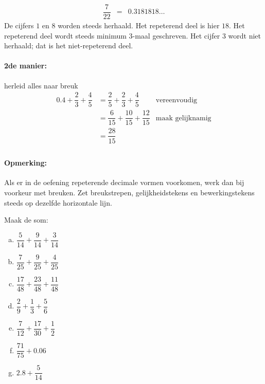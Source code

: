 \documentclass[12pt]{article}
\begin{document}
\begin{voorbeeld}
\begin{eqnarray*}
  \dfrac{7}{22} &=& 0.3181818\ldots
\end{eqnarray*}
De cijfers $1$ en $8$ worden steeds herhaald. Het repeterend deel is hier $18$.
Het repeterend deel wordt steeds minimum 3-maal geschreven.
Het cijfer $3$ wordt niet herhaald; dat is het niet-repeterend deel.
\end{voorbeeld}

\paragraph*{2de manier:} herleid alles naar breuk
\begin{align*}
  0.4 + \dfrac{2}{3} + \dfrac{4}{5} &= \dfrac{2}{5} + \dfrac{2}{3} + \dfrac{4}{5} & \text{vereenvoudig}\\
                                    &= \dfrac{6}{15} + \dfrac{10}{15} + \dfrac{12}{15} & \text{maak gelijknamig}\\
                                    &= \dfrac{28}{15}\\
\end{align*}

\paragraph*{Opmerking:} Als er in de oefening repeterende decimale vormen voorkomen, werk dan bij voorkeur met breuken.
Zet breukstrepen, gelijkheidstekens en bewerkingstekens steeds op dezelfde horizontale lijn.

\begin{exercise}
Maak de som:
\begin{multicols}{2}
  \begin{enumerate}[(a)]
    \item $\dfrac{5}{14}+\dfrac{9}{14}+\dfrac{3}{14}$
    \item $\dfrac{7}{25}+\dfrac{9}{25}+\dfrac{4}{25}$
    \item $\dfrac{17}{48}+\dfrac{23}{48}+\dfrac{11}{48}$
    \item $\dfrac{2}{9}+\dfrac{1}{3}+\dfrac{5}{6}$
    \item $\dfrac{7}{12}+\dfrac{17}{30}+\dfrac{1}{2}$
    \item $\dfrac{71}{75}+0.06$
    \item $2.8+\dfrac{5}{14}$
  \end{enumerate}
\end{multicols}
\end{exercise}
\end{document}
